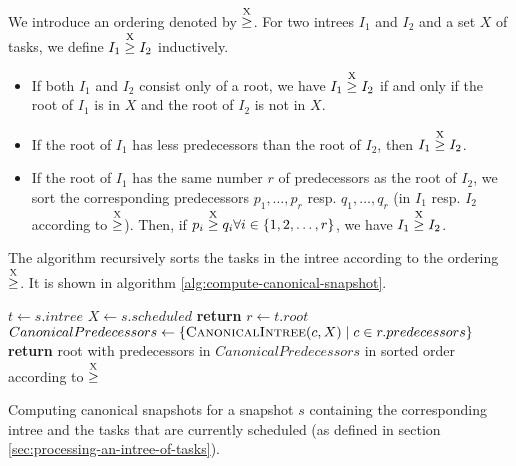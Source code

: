 \begin{definition}
  We introduce an ordering denoted by $\stackrel{\text{X}}{\geq}$. For two intrees $I_1$ and $I_2$ and a set $X$ of tasks, we define $I_1 \stackrel{\text{X}}{\geq} I_2$ inductively. 
  \begin{itemize}
  \item If both $I_1$ and $I_2$ consist only of a root, we have $I_1 \stackrel{\text{X}}{\geq} I_2$ if and only if the root of $I_1$ is in $X$ and the root of $I_2$ is not in $X$.
  \item If the root of $I_1$ has less predecessors than the root of $I_2$, then $I_1 \stackrel{\text{X}}{\geq} I_2$.
  \item If the root of $I_1$ has the same number $r$ of predecessors as the root of $I_2$, we sort the corresponding predecessors $p_1,\dots,p_r$ resp. $q_1,\dots,q_r$ (in $I_1$ resp. $I_2$ according to $\stackrel{\text{X}}{\geq}$). Then, if $p_i \stackrel{\text{X}}{\geq} q_i \forall i\in\{1,2,\dots,r \}$, we have $I_1 \stackrel{\text{X}}{\geq} I_2$.
  \end{itemize}
\end{definition}


The algorithm recursively sorts the tasks in the intree according to the ordering $\stackrel{\text{X}}{\geq}$. It is shown in algorithm \ref{alg:compute-canonical-snapshot}.

\begin{algorithm}
  \begin{algorithmic}
     
    \State $t \gets s.intree$ 
    \State $X \gets s.scheduled$ 
    \State \textbf{return}  
    \EndProcedure
    \Statex
    \State $r \gets t.root$ 
    \State $CanonicalPredecessors \gets 
           \left\{ \Call{CanonicalIntree}{c, X} \mid c \in r.predecessors \right\}$
    \State \textbf{return} root with predecessors in $CanonicalPredecessors$ in sorted order according to $\stackrel{\text{X}}{\geq}$
    \EndProcedure
    \Statex
  \end{algorithmic}
  \caption{Computing canonical snapshots for a snapshot $s$ containing the corresponding intree and the tasks that are currently scheduled (as defined in section \ref{sec:processing-an-intree-of-tasks}).}
  \label{alg:compute-canonical-snapshot}
\end{algorithm}

